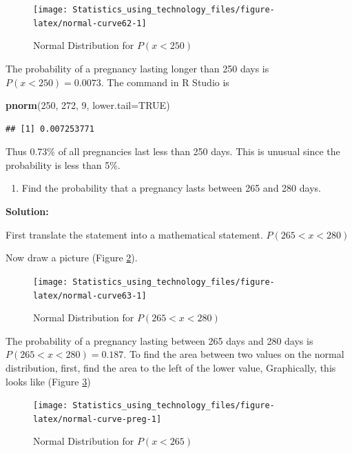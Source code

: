 \documentclass[
]{book}
\newenvironment{Shaded}{\begin{snugshade}}{\end{snugshade}}
\newcommand{\DataTypeTok}[1]{\textcolor[rgb]{0.13,0.29,0.53}{#1}}
\newcommand{\DecValTok}[1]{\textcolor[rgb]{0.00,0.00,0.81}{#1}}
\newcommand{\KeywordTok}[1]{\textcolor[rgb]{0.13,0.29,0.53}{\textbf{#1}}}
\newcommand{\NormalTok}[1]{#1}
\newcommand{\OtherTok}[1]{\textcolor[rgb]{0.56,0.35,0.01}{#1}}
\providecommand{\tightlist}{%
  \setlength{\itemsep}{0pt}\setlength{\parskip}{0pt}}
\begin{document}
\begin{figure}
\texttt{[image: Statistics\_using\_technology\_files/figure-latex/normal-curve62-1]} \caption{Normal Distribution for \(P(x<250)\)}\label{fig:normal-curve62}
\end{figure}

The probability of a pregnancy lasting longer than 250 days is \(P(x<250)=0.0073\). The command in R Studio is

\begin{Shaded}
\begin{Highlighting}[]
\KeywordTok{pnorm}\NormalTok{(}\DecValTok{250}\NormalTok{, }\DecValTok{272}\NormalTok{, }\DecValTok{9}\NormalTok{, }\DataTypeTok{lower.tail=}\OtherTok{TRUE}\NormalTok{)}
\end{Highlighting}
\end{Shaded}

\begin{verbatim}
## [1] 0.007253771
\end{verbatim}

Thus 0.73\% of all pregnancies last less than 250 days. This is unusual since the probability is less than 5\%.

\begin{enumerate}
\def\labelenumi{\alph{enumi}.}
\setcounter{enumi}{3}
\tightlist
\item
  Find the probability that a pregnancy lasts between 265 and 280 days.
\end{enumerate}

\textbf{Solution:}

First translate the statement into a mathematical statement. \(P(265<x<280)\)

Now draw a picture (Figure \ref{fig:normal-curve63}).



\begin{figure}
\texttt{[image: Statistics\_using\_technology\_files/figure-latex/normal-curve63-1]} \caption{Normal Distribution for \(P(265<x<280)\)}\label{fig:normal-curve63}
\end{figure}

The probability of a pregnancy lasting between 265 days and 280 days is \(P(265<x<280)=0.187\). To find the area between two values on the normal distribution, first, find the area to the left of the lower value, Graphically, this looks like (Figure \ref{fig:normal-curve-preg})



\begin{figure}
\texttt{[image: Statistics\_using\_technology\_files/figure-latex/normal-curve-preg-1]} \caption{Normal Distribution for \(P(x<265)\)}\label{fig:normal-curve-preg}
\end{figure}
\end{document}
